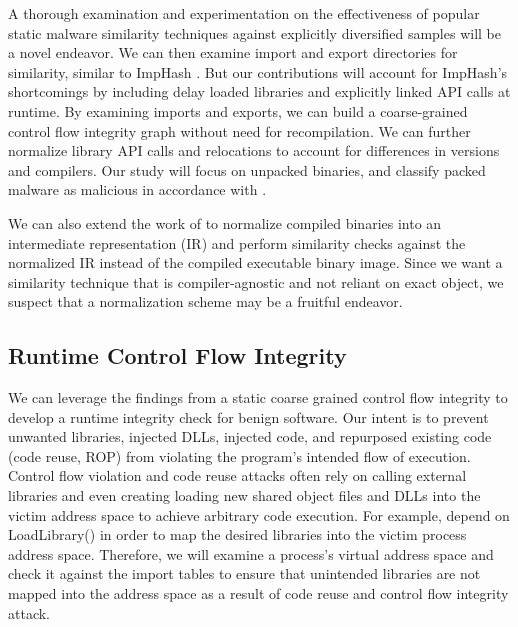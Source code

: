 \documentclass[preprint,12pt]{elsarticle}
\begin{document}
A thorough examination and experimentation on the effectiveness of popular static malware similarity techniques against explicitly diversified samples will be a novel endeavor. We can then examine import and export directories for similarity, similar to ImpHash \cite{imphash}. But our contributions will account for ImpHash's shortcomings by including delay loaded libraries and explicitly linked API calls at runtime. By examining imports and exports, we can build a coarse-grained control flow integrity graph without need for recompilation. We can further normalize library API calls and relocations to account for differences in versions and compilers. Our study will focus on unpacked binaries, and classify packed malware as malicious in accordance with \cite{osaghae2016classifying}.

We can also extend the work of \cite{david2017similarity} to normalize compiled binaries into an intermediate representation (IR) and perform similarity checks against the normalized IR instead of the compiled executable binary image. Since we want a similarity technique that is compiler-agnostic and not reliant on exact object, we suspect that a normalization scheme may be a fruitful endeavor. 

\subsection{Runtime Control Flow Integrity}

We can leverage the findings from a static coarse grained control flow integrity to develop a runtime integrity check for benign software. Our intent is to prevent unwanted libraries, injected DLLs, injected code, and repurposed existing code (code reuse, ROP) from violating the program's intended flow of execution. Control flow violation and code reuse attacks often rely on calling external libraries and even creating loading new shared object files and DLLs into the victim address space to achieve arbitrary code execution. For example, \cite{snow2013just} depend on LoadLibrary() in order to map the desired libraries into the victim process address space. Therefore, we will examine a process's virtual address space and check it against the import tables to ensure that unintended libraries are not mapped into the address space as a result of code reuse and control flow integrity attack. 
\end{document}
